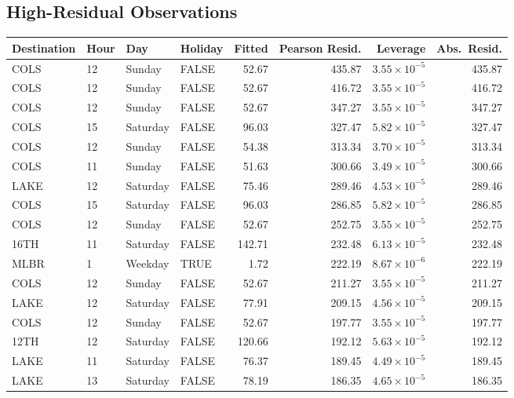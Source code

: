 \documentclass[11pt, letterpaper]{article}
\begin{document}
\subsection*{High-Residual Observations}

\begin{table}[h]
\centering
\small
\begin{tabular}{llllrrrr}
\hline
\textbf{Destination} & \textbf{Hour} & \textbf{Day} & \textbf{Holiday} & \textbf{Fitted} & \textbf{Pearson Resid.} & \textbf{Leverage} & \textbf{Abs.\ Resid.} \\
\hline
COLS  & 12 & Sunday   & FALSE & 52.67  & 435.87 & $3.55 \times 10^{-5}$ & 435.87 \\
COLS  & 12 & Sunday   & FALSE & 52.67  & 416.72 & $3.55 \times 10^{-5}$ & 416.72 \\
COLS  & 12 & Sunday   & FALSE & 52.67  & 347.27 & $3.55 \times 10^{-5}$ & 347.27 \\
COLS  & 15 & Saturday & FALSE & 96.03  & 327.47 & $5.82 \times 10^{-5}$ & 327.47 \\
COLS  & 12 & Sunday   & FALSE & 54.38  & 313.34 & $3.70 \times 10^{-5}$ & 313.34 \\
COLS  & 11 & Sunday   & FALSE & 51.63  & 300.66 & $3.49 \times 10^{-5}$ & 300.66 \\
LAKE  & 12 & Saturday & FALSE & 75.46  & 289.46 & $4.53 \times 10^{-5}$ & 289.46 \\
COLS  & 15 & Saturday & FALSE & 96.03  & 286.85 & $5.82 \times 10^{-5}$ & 286.85 \\
COLS  & 12 & Sunday   & FALSE & 52.67  & 252.75 & $3.55 \times 10^{-5}$ & 252.75 \\
16TH  & 11 & Saturday & FALSE & 142.71 & 232.48 & $6.13 \times 10^{-5}$ & 232.48 \\
MLBR  & 1  & Weekday  & TRUE  &  1.72  & 222.19 & $8.67 \times 10^{-6}$ & 222.19 \\
COLS  & 12 & Sunday   & FALSE & 52.67  & 211.27 & $3.55 \times 10^{-5}$ & 211.27 \\
LAKE  & 12 & Saturday & FALSE & 77.91  & 209.15 & $4.56 \times 10^{-5}$ & 209.15 \\
COLS  & 12 & Sunday   & FALSE & 52.67  & 197.77 & $3.55 \times 10^{-5}$ & 197.77 \\
12TH  & 12 & Saturday & FALSE & 120.66 & 192.12 & $5.63 \times 10^{-5}$ & 192.12 \\
LAKE  & 11 & Saturday & FALSE & 76.37  & 189.45 & $4.49 \times 10^{-5}$ & 189.45 \\
LAKE  & 13 & Saturday & FALSE & 78.19  & 186.35 & $4.65 \times 10^{-5}$ & 186.35 \\

\end{tabular}
\end{table}
\end{document}
